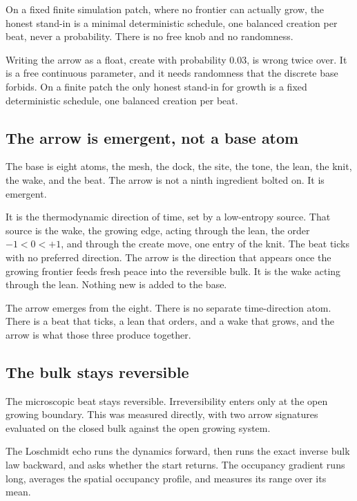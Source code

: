 On a fixed finite simulation patch, where no frontier can actually grow, the honest stand-in is a minimal deterministic schedule, one balanced creation per beat, never a probability. There is no free knob and no randomness.

\begin{principle}
Writing the arrow as a float, create with probability $0.03$, is wrong twice over. It is a free continuous parameter, and it needs randomness that the discrete base forbids. On a finite patch the only honest stand-in for growth is a fixed deterministic schedule, one balanced creation per beat.
\end{principle}

\subsection{The arrow is emergent, not a base atom}

The base is eight atoms, the mesh, the dock, the site, the tone, the lean, the knit, the wake, and the beat. The arrow is not a ninth ingredient bolted on. It is emergent.

It is the thermodynamic direction of time, set by a low-entropy source. That source is the wake, the growing edge, acting through the lean, the order $-1 < 0 < +1$, and through the create move, one entry of the knit. The beat ticks with no preferred direction. The arrow is the direction that appears once the growing frontier feeds fresh peace into the reversible bulk. It is the wake acting through the lean. Nothing new is added to the base.

\begin{result}
The arrow emerges from the eight. There is no separate time-direction atom. There is a beat that ticks, a lean that orders, and a wake that grows, and the arrow is what those three produce together.
\end{result}

\subsection{The bulk stays reversible}

The microscopic beat stays reversible. Irreversibility enters only at the open growing boundary. This was measured directly, with two arrow signatures evaluated on the closed bulk against the open growing system.

The Loschmidt echo runs the dynamics forward, then runs the exact inverse bulk law backward, and asks whether the start returns. The occupancy gradient runs long, averages the spatial occupancy profile, and measures its range over its mean.

